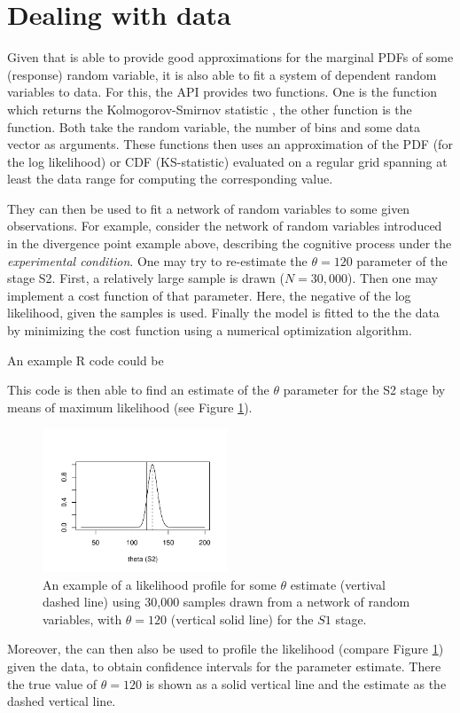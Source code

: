 \section{Dealing with data} \label{sec:data}
Given that  is able to provide good approximations for the marginal PDFs of some
(response) random variable, it is also able to fit a system of dependent random variables to data.
For this, the  API provides two functions. One is the  function
which returns the Kolmogorov-Smirnov statistic \cite[KS-statistic, e.g.,][]{Kolmogorov1933,
Smirnov1948, Marsaglia2003}, the other function is the  function. Both take
the random variable, the number of bins and some data vector as arguments. These functions then
uses an approximation of the PDF (for the log likelihood) or CDF (KS-statistic) evaluated on a
regular grid spanning at least the data range for computing the corresponding value.

They can then be used to fit a network of random variables to some given observations. For
example, consider the network of random variables introduced in the divergence point example 
above, describing the cognitive
process under the \emph{experimental condition}. One may try to re-estimate the $\theta=120$
parameter of the stage S2. First, a relatively large sample is drawn ($N=30,000$). Then one may
implement a cost function of that parameter. Here, the negative of the log likelihood, given the
samples is used. Finally the model is fitted to the the data by minimizing the cost function using
a numerical optimization algorithm.

An example R code could be


This code is then able to find an estimate of the $\theta$ parameter for the S2 stage by means of
maximum likelihood (see Figure
\ref{fig:llprof}). 

\begin{figure}[!ht]
 \centering
 \includegraphics[width=0.49\textwidth]{fig/pod_likelihoodProf.pdf}
 \caption{An example of a likelihood profile for some $\theta$ estimate (vertival dashed line)
 using 30,000 samples drawn from a network of random variables, with $\theta=120$ (vertical
 solid line) for the $S1$ stage.} \label{fig:llprof}
\end{figure}

Moreover, the  can then also be used to profile the likelihood (compare Figure
\ref{fig:llprof}) given the data, to obtain confidence intervals for the parameter estimate. There
the true value of $\theta=120$ is shown as a solid vertical line and the estimate as the dashed
vertical line. 